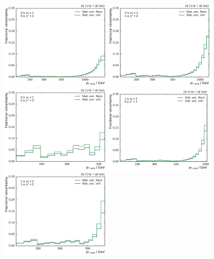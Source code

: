 \begin{figure}[htbp]
    \centering
    \includegraphics[width=0.47\textwidth]{figures/measurement/statunc_fractional_yb0ys0.pdf}\hfill
    \includegraphics[width=0.47\textwidth]{figures/measurement/statunc_fractional_yb0ys1.pdf}
    \includegraphics[width=0.47\textwidth]{figures/measurement/statunc_fractional_yb0ys2.pdf}\hfill
    \includegraphics[width=0.47\textwidth]{figures/measurement/statunc_fractional_yb1ys0.pdf}
    \includegraphics[width=0.47\textwidth]{figures/measurement/statunc_fractional_yb1ys1.pdf}\hfill

\end{figure}
